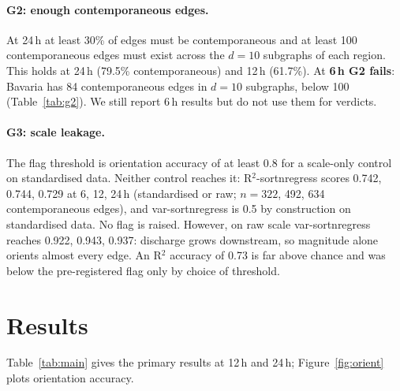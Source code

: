 \documentclass[10pt,a4paper]{article}
\begin{document}
\begin{table}[t]\centering\small

\caption{G1 by region (threshold 0.70 pooled). Edges counted once per subgraph occurrence.}\label{tab:g1}
\end{table}

\paragraph{G2: enough contemporaneous edges.}
At 24\,h at least 30\% of edges must be contemporaneous and at least 100 contemporaneous edges must exist across the $d{=}10$ subgraphs of each region. This holds at 24\,h (79.5\% contemporaneous) and 12\,h (61.7\%). At \textbf{6\,h G2 fails}: Bavaria has 84 contemporaneous edges in $d{=}10$ subgraphs, below 100 (Table~\ref{tab:g2}). We still report 6\,h results but do not use them for verdicts.

\begin{table}[t]\centering\small

\caption{G2: fraction of contemporaneous edges (all regions) and contemporaneous/total edge counts in $d{=}10$ subgraphs of East Germany (ES) and Bavaria (BA).}\label{tab:g2}
\end{table}

\paragraph{G3: scale leakage.}
The flag threshold is orientation accuracy of at least 0.8 for a scale-only control on standardised data. Neither control reaches it: R$^2$-sortnregress scores 0.742, 0.744, 0.729 at 6, 12, 24\,h (standardised or raw; $n=322$, 492, 634 contemporaneous edges), and var-sortnregress is 0.5 by construction on standardised data. No flag is raised. However, on raw scale var-sortnregress reaches 0.922, 0.943, 0.937: discharge grows downstream, so magnitude alone orients almost every edge. An R$^2$ accuracy of 0.73 is far above chance and was below the pre-registered flag only by choice of threshold.

\section{Results}
Table~\ref{tab:main} gives the primary results at 12\,h and 24\,h; Figure~\ref{fig:orient} plots orientation accuracy.

\begin{table}[t]\centering\footnotesize

\caption{Test seeds, standardised, $p=1$. Orientation accuracy is on true contemporaneous edges given the skeleton; ``by def.'' means 0.5 by definition. Subgraphs without contemporaneous edges contribute nothing to accuracy. The random control's 12\,h interval excludes 0.5 (0.585 [0.542, 0.626]); we have not investigated this, and it is a reminder that these intervals are not calibrated tests.}\label{tab:main}
\end{table}
\end{document}
